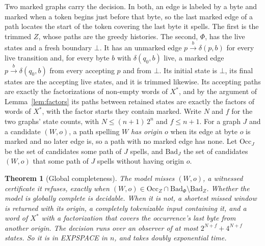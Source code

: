 \documentclass[11pt,a4paper]{article}
\theoremstyle{definition}
\theoremstyle{plain}
\newtheorem{theorem}{Theorem}
\begin{document}
Two marked graphs carry the decision. In both, an edge is labeled by a byte and marked when a token begins just before
that byte, so the last marked edge of a path locates the start of the token covering the last byte it spells. The first
is the trimmed $Z$, whose paths are the greedy histories. The second, $\Phi$, has the live states and a fresh boundary
$\bot$. It has an unmarked edge $p \xrightarrow{b} \delta(p, b)$ for every live transition and, for every byte $b$ with
$\delta(q_0, b)$ live, a marked edge $p \xrightarrow{b} \delta(q_0, b)$ from every accepting $p$ and from $\bot$. Its
initial state is $\bot$, its final states are the accepting live states, and it is trimmed likewise. Its accepting paths
are exactly the factorizations of non-empty words of $X^*$, and by the argument of Lemma~\ref{lem:factors} its paths
between retained states are exactly the factors of words of $X^*$, with the factor starts they contain marked. Write $N$
and $f$ for the two graphs' state counts, with $N \leq (n + 1)\, 2^n$ and $f \leq n + 1$. For a graph $J$ and a
candidate $(W, o)$, a path spelling $W$ \emph{has origin $o$} when its edge at byte $o$ is marked and no later edge is,
so a path with no marked edge has none. Let $\mathrm{Occ}_J$ be the set of candidates some path of $J$ spells, and
$\mathrm{Bad}_J$ the set of candidates $(W, o)$ that some path of $J$ spells without having origin $o$.

\begin{theorem}[Global completeness]
\label{thm:complete}
The model misses $(W, o)$, a witnessed certificate it refuses, exactly when
$(W, o) \in \mathrm{Occ}_Z \cap \mathrm{Bad}_\Phi \setminus \mathrm{Bad}_Z$. Whether the model is globally complete is
decidable. When it is not, a shortest missed window is returned with its origin, a completely tokenizable input
containing it, and a word of $X^*$ with a factorization that covers the occurrence's last byte from another origin. The
decision runs over an observer of at most $2^{N + f} + 4^{N + f}$ states. So it is in EXPSPACE in $n$, and takes doubly
exponential time.
\end{theorem}
\end{document}
